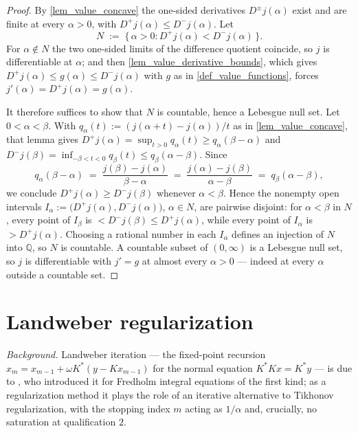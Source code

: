 \documentclass[a4paper]{report}
\theoremstyle{plain}
\theoremstyle{definition}
\theoremstyle{remark}
\begin{document}
\begin{proof}
  By \cref{lem_value_concave} the one-sided derivatives $D^{\pm}j(\alpha)$ exist and are
  finite at every $\alpha > 0$, with $D^{+}j(\alpha) \le D^{-}j(\alpha)$.  Let
  \[
    N \;:=\; \{\,\alpha > 0 : D^{+}j(\alpha) < D^{-}j(\alpha)\,\} .
  \]
  For $\alpha \notin N$ the two one-sided limits of the difference quotient coincide, so
  $j$ is differentiable at $\alpha$; and then \cref{lem_value_derivative_bounds}, which
  gives $D^{+}j(\alpha) \le g(\alpha) \le D^{-}j(\alpha)$ with $g$ as in
  \cref{def_value_functions}, forces $j'(\alpha) = D^{+}j(\alpha) = g(\alpha)$.

  It therefore suffices to show that $N$ is countable, hence a Lebesgue null set.  Let
  $0 < \alpha < \beta$.  With $q_{\alpha}(t) := (j(\alpha+t)-j(\alpha))/t$ as in
  \cref{lem_value_concave}, that lemma gives $D^{+}j(\alpha) = \sup_{t>0}q_{\alpha}(t)
  \ge q_{\alpha}(\beta-\alpha)$ and $D^{-}j(\beta) = \inf_{-\beta<t<0}q_{\beta}(t) \le
  q_{\beta}(\alpha-\beta)$.  Since
  \[
    q_{\alpha}(\beta-\alpha) \;=\; \frac{j(\beta)-j(\alpha)}{\beta-\alpha}
      \;=\; \frac{j(\alpha)-j(\beta)}{\alpha-\beta} \;=\; q_{\beta}(\alpha-\beta),
  \]
  we conclude $D^{+}j(\alpha) \ge D^{-}j(\beta)$ whenever $\alpha < \beta$.  Hence the
  nonempty open intervals $I_{\alpha} := \bigl(D^{+}j(\alpha), D^{-}j(\alpha)\bigr)$,
  $\alpha \in N$, are pairwise disjoint: for $\alpha < \beta$ in $N$, every point of
  $I_{\beta}$ is $< D^{-}j(\beta) \le D^{+}j(\alpha)$, while every point of $I_{\alpha}$
  is $> D^{+}j(\alpha)$.  Choosing a rational number in each $I_{\alpha}$ defines an
  injection of $N$ into $\mathbb{Q}$, so $N$ is countable.  A countable subset of
  $(0,\infty)$ is a Lebesgue null set, so $j$ is differentiable with $j' = g$ at almost
  every $\alpha > 0$ --- indeed at every $\alpha$ outside a countable set.
\end{proof}


\chapter{Landweber regularization}
\label{ch_17_landweber}

\noindent\emph{Background.} Landweber iteration --- the fixed-point recursion
$x_m = x_{m-1} + \omega K^{*}(y - Kx_{m-1})$ for the normal equation $K^{*}Kx = K^{*}y$
--- is due to \citet{Landweber1951}, who introduced it for Fredholm integral equations of
the first kind; as a regularization method it plays the role of an iterative alternative
to Tikhonov regularization, with the stopping index $m$ acting as $1/\alpha$ and,
crucially, no saturation at qualification $2$.
\end{document}
